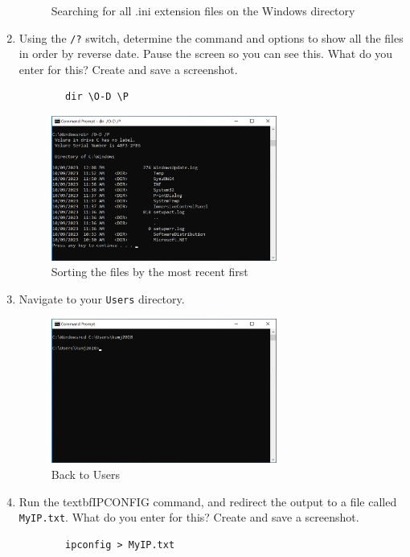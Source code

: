 \documentclass[12pt]{article}
\newenvironment{problem}[2][Problem]{\begin{trivlist}
\item[\hskip \labelsep {\bfseries #1}\hskip \labelsep {\bfseries #2.}]}{\end{trivlist}}
\begin{document}
\begin{problem}{1}
\begin{enumerate}
\begin{figure}[H]
        \caption{Searching for all .ini extension files on the Windows directory}
    \end{figure}
    \item Using the \verb|/?| switch, determine the command and options to show all the files in order by reverse date. Pause the screen so you can see this. What do you enter for this? Create and save a screenshot.
    \begin{verbatim}
        dir \O-D \P
    \end{verbatim}
    \begin{figure}[H]
        \centering
        \includegraphics[width=0.7\textwidth]{sort}
        \caption{Sorting the files by the most recent first}
    \end{figure}
    \item Navigate to your \verb|Users| directory.
    \begin{figure}[H]
        \centering
        \includegraphics[width=0.7\textwidth]{cd}
        \caption{Back to Users}
    \end{figure}
    \item Run the textbf{IPCONFIG} command, and redirect the output to a file called \verb|MyIP.txt|. What do you enter for this? Create and save a screenshot.
    \begin{verbatim}
        ipconfig > MyIP.txt
    \end{verbatim}

\end{enumerate}
\end{problem}
\end{document}
